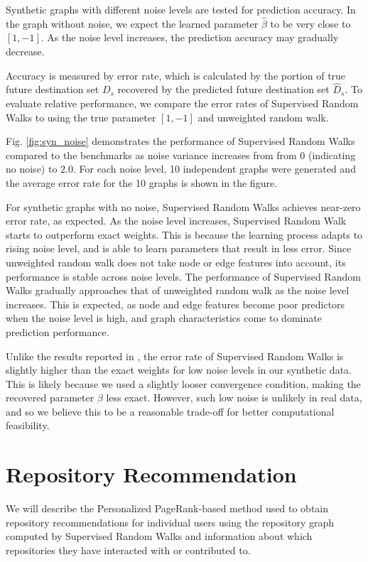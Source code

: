 \documentclass[10pt]{article}
\begin{document}
\begin{multicols}{2}
Synthetic graphs with different noise levels are tested for prediction accuracy. In the graph without noise, we expect the learned parameter $\hat{\beta}$ to be very close to $\left[ 1, -1\right]$. As the noise level increases, the prediction accuracy may gradually decrease.

Accuracy is measured by error rate, which is calculated by the portion of true future destination set $D_{s}$ recovered by the predicted future destination set $\hat{D}_{s}$. To evaluate relative performance, we compare the error rates of Supervised Random Walks to using the true parameter $\left[ 1, -1\right]$ and unweighted random walk.

Fig. \ref{fig:syn_noise} demonstrates the performance of Supervised Random Walks compared to the benchmarks as noise variance increases from from $0$ (indicating no noise) to $2.0$. For each noise level, 10 independent graphs were generated and the average error rate for the 10 graphs is shown in the figure.

For synthetic graphs with no noise, Supervised Random Walks achieves near-zero error rate, as expected. As the noise level increases, Supervised Random Walk starts to outperform exact weights. This is because the learning process adapts to rising noise level, and is able to learn parameters that result in less error. Since unweighted random walk does not take node or edge features into account, its performance is stable across noise levels. The performance of Supervised Random Walks gradually approaches that of unweighted random walk as the noise level increases. This is expected, as node and edge features become poor predictors when the noise level is high, and graph characteristics come to dominate prediction performance.

Unlike the results reported in \cite{backstrom}, the error rate of Supervised Random Walks is slightly higher than the exact weights for low noise levels in our synthetic data. This is likely because we used a slightly looser convergence condition, making the recovered parameter $\beta$ less exact. However, such low noise is unlikely in real data, and so we believe this to be a reasonable trade-off for better computational feasibility.

\section{Repository Recommendation}

We will describe the Personalized PageRank-based method used to obtain repository recommendations for individual users using the repository graph computed by Supervised Random Walks and information about which repositories they have interacted with or contributed to.


\end{multicols}
\end{document}
